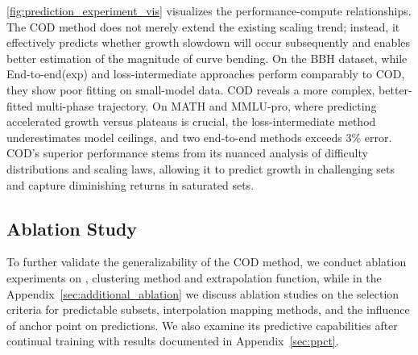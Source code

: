 \begin{figure}[!t]
\end{figure}

\cref{fig:prediction_experiment_vis} visualizes the performance-compute relationships. The COD method does not merely extend the existing scaling trend; instead, it effectively predicts whether growth slowdown will occur subsequently and enables better estimation of the magnitude of curve bending.
On the BBH dataset, while End-to-end(exp) and loss-intermediate approaches perform comparably to COD, they show poor fitting on small-model data. COD reveals a more complex, better-fitted multi-phase trajectory. On MATH and MMLU-pro, where predicting accelerated growth versus plateaus is crucial, the loss-intermediate method underestimates model ceilings, and two end-to-end methods exceeds 3\% error. COD's superior performance stems from its nuanced analysis of difficulty distributions and scaling laws, allowing it to predict growth in challenging sets and capture diminishing returns in saturated sets.

\vspace{-5pt}
\subsection{Ablation Study}
To further validate the generalizability of the COD method, we conduct ablation experiments on , clustering method and extrapolation function, while in the Appendix~\ref{sec:additional_ablation} we discuss ablation studies on the selection criteria for predictable subsets, interpolation mapping methods, and the influence of anchor point on predictions. We also examine its predictive capabilities after continual training with results documented in Appendix~\ref{sec:ppct}.



